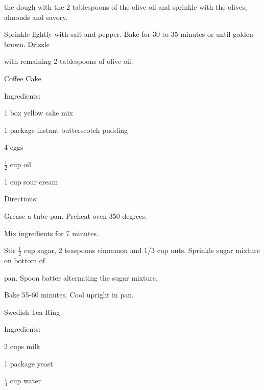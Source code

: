 \documentclass[a4paper,portrait,12pt]{book}
\begin{document}
the dough with the 2 tablespoons of the olive oil and sprinkle with the olives, almonds and savory.




Sprinkle lightly with salt and pepper. Bake for 30 to 35 minutes or until golden brown. Drizzle




with remaining 2 tablespoons of olive oil.







\newpage
Coffee Cake




Ingredients:




1 box yellow cake mix




1 package instant butterscotch pudding




4 eggs




$\frac{1}{2}$ cup oil




1 cup sour cream




Directions:




Grease a tube pan. Preheat oven 350 degrees.




Mix ingredients for 7 minutes.




Stir $\frac{1}{2}$ cup sugar, 2 teaspoons cinnamon and 1/3 cup nuts. Sprinkle sugar mixture on bottom of




pan. Spoon batter alternating the sugar mixture.




Bake 55-60 minutes. Cool upright in pan.







\newpage
Swedish Tea Ring




Ingredients:




2 cups milk




1 package yeast




$\frac{1}{4}$ cup water
\end{document}
